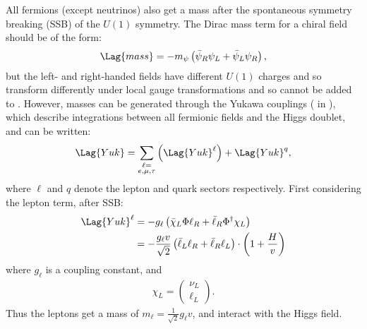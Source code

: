 All fermions (except neutrinos) also get a mass after the spontaneous symmetry breaking (SSB) of
the $U(1)$ symmetry.
The Dirac mass term for a chiral field should be of the form:
\begin{equation}
  \Lag{mass} = -m_\psi\left(\bar\psi_R\psi_L + \bar\psi_L\psi_R\right),
\end{equation}
but the left- and right-handed fields have different $U(1)$ charges %
and so transform differently under local gauge transformations and so cannot be added to .
However, masses can be generated through the Yukawa couplings ( in ), which
describe integrations between all fermionic fields and the Higgs doublet, and can be written:
\begin{equation}
  \Lag{Yuk} = \sum_{\substack{\ell=\\e,\mu,\tau}}\left(\Lag{Yuk}^\ell\right) + \Lag{Yuk}^q,
  \label{eq:th:yukking}
\end{equation}
where $\ell$ and $q$ denote the lepton and quark sectors respectively.
First considering the lepton term, after SSB:
\begin{align}
  \Lag{Yuk}^\ell
  &= - g_\ell\left(\bar\chi_L\Phi \ell_R + \bar \ell_R\Phi^\dagger\chi_L\right) \\
  &= - \frac{g_\ell v}{\sqrt{2}}\left(\bar\ell_L\ell_R + \bar\ell_R\ell_L\right)\cdot
  \left(1 + \frac{H}{v}\right)
\end{align}
where $g_\ell$ is a coupling constant, and
\begin{align}
  \chi_L = \begin{pmatrix}\nu_L \\ \ell_L \end{pmatrix}.
\end{align}
Thus the leptons get a mass of $m_\ell = \tfrac{1}{\sqrt{2}}g_\ell v$, and interact with the Higgs
field.

